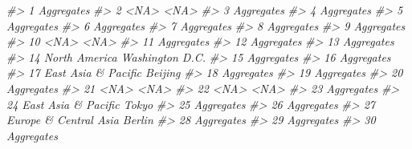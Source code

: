 \documentclass[
  xelatex, ja=standard]{bxjsbook}
\newenvironment{Shaded}{\begin{snugshade}}{\end{snugshade}}
\newcommand{\CommentTok}[1]{\textcolor[rgb]{0.56,0.35,0.01}{\textit{#1}}}
\theoremstyle{definition}
\theoremstyle{definition}
\theoremstyle{definition}
\theoremstyle{definition}
\theoremstyle{remark}
\begin{document}
\begin{Shaded}
\begin{Highlighting}[]
\CommentTok{\#\textgreater{} 1                   Aggregates                    }
\CommentTok{\#\textgreater{} 2                         \textless{}NA\textgreater{}                \textless{}NA\textgreater{}}
\CommentTok{\#\textgreater{} 3                   Aggregates                    }
\CommentTok{\#\textgreater{} 4                   Aggregates                    }
\CommentTok{\#\textgreater{} 5                   Aggregates                    }
\CommentTok{\#\textgreater{} 6                   Aggregates                    }
\CommentTok{\#\textgreater{} 7                   Aggregates                    }
\CommentTok{\#\textgreater{} 8                   Aggregates                    }
\CommentTok{\#\textgreater{} 9                   Aggregates                    }
\CommentTok{\#\textgreater{} 10                        \textless{}NA\textgreater{}                \textless{}NA\textgreater{}}
\CommentTok{\#\textgreater{} 11                  Aggregates                    }
\CommentTok{\#\textgreater{} 12                  Aggregates                    }
\CommentTok{\#\textgreater{} 13                  Aggregates                    }
\CommentTok{\#\textgreater{} 14               North America     Washington D.C.}
\CommentTok{\#\textgreater{} 15                  Aggregates                    }
\CommentTok{\#\textgreater{} 16                  Aggregates                    }
\CommentTok{\#\textgreater{} 17         East Asia \& Pacific             Beijing}
\CommentTok{\#\textgreater{} 18                  Aggregates                    }
\CommentTok{\#\textgreater{} 19                  Aggregates                    }
\CommentTok{\#\textgreater{} 20                  Aggregates                    }
\CommentTok{\#\textgreater{} 21                        \textless{}NA\textgreater{}                \textless{}NA\textgreater{}}
\CommentTok{\#\textgreater{} 22                        \textless{}NA\textgreater{}                \textless{}NA\textgreater{}}
\CommentTok{\#\textgreater{} 23                  Aggregates                    }
\CommentTok{\#\textgreater{} 24         East Asia \& Pacific               Tokyo}
\CommentTok{\#\textgreater{} 25                  Aggregates                    }
\CommentTok{\#\textgreater{} 26                  Aggregates                    }
\CommentTok{\#\textgreater{} 27       Europe \& Central Asia              Berlin}
\CommentTok{\#\textgreater{} 28                  Aggregates                    }
\CommentTok{\#\textgreater{} 29                  Aggregates                    }
\CommentTok{\#\textgreater{} 30                  Aggregates                    }

\end{Highlighting}
\end{Shaded}
\end{document}
